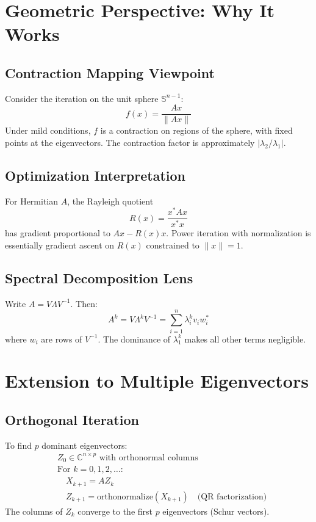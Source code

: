 \documentclass[11pt]{article}
\begin{document}
\section{Geometric Perspective: Why It Works}

\subsection{Contraction Mapping Viewpoint}
Consider the iteration on the unit sphere $\mathbb{S}^{n-1}$:
\[
f(x) = \frac{Ax}{\|Ax\|}
\]
Under mild conditions, $f$ is a contraction on regions of the sphere, with fixed points at the eigenvectors. The contraction factor is approximately $|\lambda_2/\lambda_1|$.

\subsection{Optimization Interpretation}
For Hermitian $A$, the Rayleigh quotient
\[
R(x) = \frac{x^* A x}{x^* x}
\]
has gradient proportional to $Ax - R(x)x$. Power iteration with normalization is essentially gradient ascent on $R(x)$ constrained to $\|x\|=1$.

\subsection{Spectral Decomposition Lens}
Write $A = V\Lambda V^{-1}$. Then:
\[
A^k = V\Lambda^k V^{-1} = \sum_{i=1}^n \lambda_i^k v_i w_i^*
\]
where $w_i$ are rows of $V^{-1}$. The dominance of $\lambda_1^k$ makes all other terms negligible.

\section{Extension to Multiple Eigenvectors}

\subsection{Orthogonal Iteration}
To find $p$ dominant eigenvectors:
\begin{align*}
& Z_0 \in \mathbb{C}^{n \times p} \text{ with orthonormal columns} \\
& \text{For } k = 0, 1, 2, \dots: \\
& \quad X_{k+1} = A Z_k \\
& \quad Z_{k+1} = \text{orthonormalize}(X_{k+1}) \quad \text{(QR factorization)}
\end{align*}
The columns of $Z_k$ converge to the first $p$ eigenvectors (Schur vectors).
\end{document}
